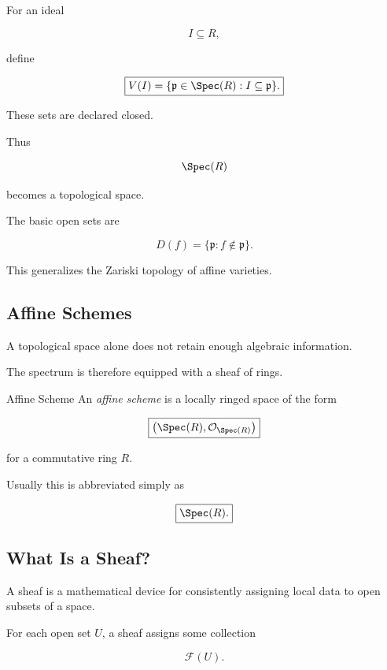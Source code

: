 For an ideal

\[
I\subseteq R,
\]

define

\[
\boxed{
V(I)
=
\{
\mathfrak p\in\Spec(R):
I\subseteq\mathfrak p
\}.
}
\]

These sets are declared closed.

Thus

\[
\Spec(R)
\]

becomes a topological space.

The basic open sets are

\[
\boxed{
D(f)
=
\{
\mathfrak p:
f\notin\mathfrak p
\}.
}
\]

This generalizes the Zariski topology of affine varieties.

\subsection{Affine Schemes}
\label{subsec:affine-schemes}

A topological space alone does not retain enough algebraic information.

The spectrum is therefore equipped with a sheaf of rings.

\begin{definitionbox}{Affine Scheme}
An \emph{affine scheme} is a locally ringed space of the form

\[
\boxed{
\bigl(
\Spec(R),
\mathcal{O}_{\Spec(R)}
\bigr)
}
\]

for a commutative ring \(R\).
\end{definitionbox}

Usually this is abbreviated simply as

\[
\boxed{
\Spec(R).
}
\]

\subsection{What Is a Sheaf?}
\label{subsec:algebraic-geometry-sheaves}

A sheaf is a mathematical device for consistently assigning local data to
open subsets of a space.

For each open set \(U\), a sheaf assigns some collection

\[
\mathcal{F}(U).
\]

